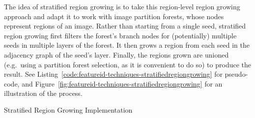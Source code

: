 The idea of stratified region growing is to take this region-level region growing approach and adapt it to work with image partition forests, whose nodes represent regions of an image. Rather than starting from a single seed, stratified region growing first filters the forest's branch nodes for (potentially) multiple seeds in multiple layers of the forest. It then grows a region from each seed in the adjacency graph of the seed's layer. Finally, the regions grown are unioned (e.g.~using a partition forest selection, as it is convenient to do so) to produce the result. See Listing~\ref{code:featureid-techniques-stratifiedregiongrowing} for pseudo-code, and Figure~\ref{fig:featureid-techniques-stratifiedregiongrowing} for an illustration of the process.

\begin{stulisting}[p]
\caption{Stratified Region Growing Implementation}
\label{code:featureid-techniques-stratifiedregiongrowing}

\end{stulisting}

